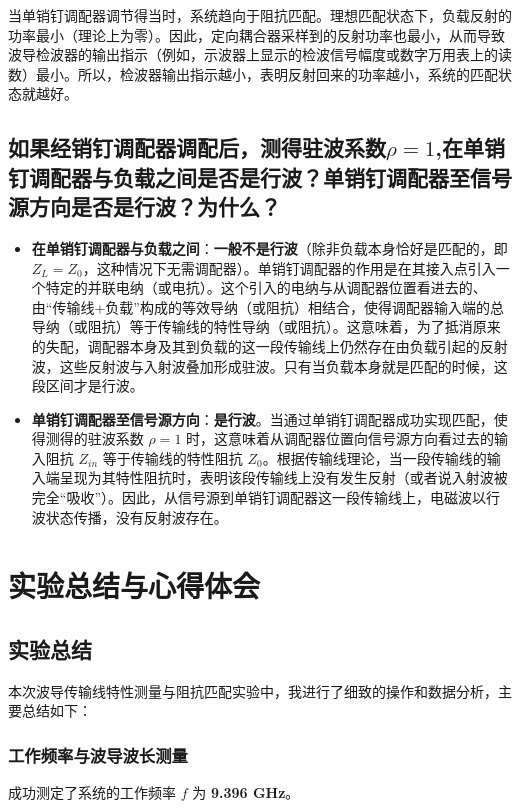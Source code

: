 \documentclass[12pt,a4paper,UTF8]{article}
\begin{document}
当单销钉调配器调节得当时，系统趋向于阻抗匹配。理想匹配状态下，负载反射的功率最小（理论上为零）。因此，定向耦合器采样到的反射功率也最小，从而导致波导检波器的输出指示（例如，示波器上显示的检波信号幅度或数字万用表上的读数）最小。所以，检波器输出指示越小，表明反射回来的功率越小，系统的匹配状态就越好。

\subsection{如果经销钉调配器调配后，测得驻波系数$\rho=1$,在单销钉调配器与负载之间是否是行波？单销钉调配器至信号源方向是否是行波？为什么？}
\begin{itemize}
    \item \textbf{在单销钉调配器与负载之间}：\textbf{一般不是行波}（除非负载本身恰好是匹配的，即 $Z_L = Z_0$，这种情况下无需调配器）。单销钉调配器的作用是在其接入点引入一个特定的并联电纳（或电抗）。这个引入的电纳与从调配器位置看进去的、由“传输线+负载”构成的等效导纳（或阻抗）相结合，使得调配器输入端的总导纳（或阻抗）等于传输线的特性导纳（或阻抗）。这意味着，为了抵消原来的失配，调配器本身及其到负载的这一段传输线上仍然存在由负载引起的反射波，这些反射波与入射波叠加形成驻波。只有当负载本身就是匹配的时候，这段区间才是行波。

    \item \textbf{单销钉调配器至信号源方向}：\textbf{是行波}。当通过单销钉调配器成功实现匹配，使得测得的驻波系数 $\rho=1$ 时，这意味着从调配器位置向信号源方向看过去的输入阻抗 $Z_{in}$ 等于传输线的特性阻抗 $Z_0$。根据传输线理论，当一段传输线的输入端呈现为其特性阻抗时，表明该段传输线上没有发生反射（或者说入射波被完全“吸收”）。因此，从信号源到单销钉调配器这一段传输线上，电磁波以行波状态传播，没有反射波存在。
\end{itemize}
\section{实验总结与心得体会}
\subsection{实验总结}

本次波导传输线特性测量与阻抗匹配实验中，我进行了细致的操作和数据分析，主要总结如下：

\subsubsection{工作频率与波导波长测量}
成功测定了系统的工作频率 $ f $ 为 \textbf{9.396 GHz}。
\end{document}
